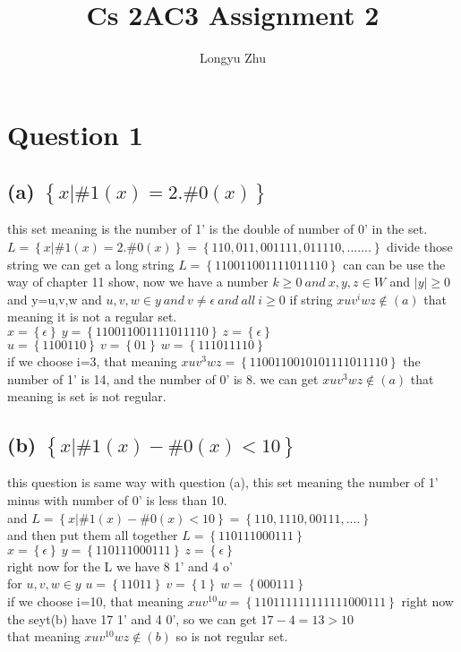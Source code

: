 \documentclass[12pt]{article}
\title{Cs 2AC3 Assignment 2}
\author{Longyu Zhu}
\begin{document}
\section*{Question 1}\nonumber
\subsection*{(a) $\left\{x|\#1\left(x\right)=2.\#0\left(x\right)\right\}$}\nonumber
this set meaning is the number of 1' is the double of number of 0' in the set.
$L=\left\{x|\#1\left(x\right)=2.\#0\left(x\right)\right\}=\left\{110,011,001111,011110,.......\right\}$ divide those string we 
can get a long string $L=\left\{110011001111011110\right\}$ can can be use the way of chapter 11 show, now we have a number $k\geq 0~and~x,y,z\in W$
and $|y|\geq0$ and y=u,v,w and $u,v,w\in y~and~v\neq \epsilon ~and~all~i\geq 0 $ if string $xuv^iwz\notin \left(a\right)$ that meaning it is not a regular set.\\
$x=\left\{\epsilon\right\}~y=\left\{110011001111011110\right\}~z=\left\{\epsilon\right\}$\\
$u=\left\{1100110\right\}~v=\left\{01\right\}~w=\left\{111011110\right\}$\\
if we choose i=3, that meaning $xuv^3wz=\left\{1100110010101111011110\right\}$ the number of 1' is 14, and the number of 0' is 8. we can get $xuv^3wz\notin\left(a\right)$
that meaning is set is not regular.\\

\subsection*{(b) $\left\{ x|\#1\left(x\right)-\#0\left(x\right)<10 \right\}$}\nonumber
this question is same way with question (a), this set meaning the number of 1' minus with number of 0' is less than 10.\\
and $L=\left\{ x|\#1\left(x\right)-\#0\left(x\right)<10 \right\}=\left\{110,1110,00111,....\right\}$\\
and then put them all together $L=\left\{110111000111\right\}$\\
$x=\left\{\epsilon\right\}~y=\left\{110111000111\right\}~z=\left\{\epsilon\right\}$\\
right now for the L we have 8 1' and 4 o'\\
for $u,v,w\in y$ 
$u=\left\{11011\right\}~v=\left\{1\right\}~w=\left\{000111\right\}$\\
if we choose i=10, that meaning $xuv^{10}w=\left\{11011 1111111111 000111\right\}$ right now the seyt(b) have 17 1' and 4 0',
so we can get $17-4=13>10$\\
that meaning $xuv^{10}wz\notin \left(b\right)$ so is not regular set.\\
\end{document}
